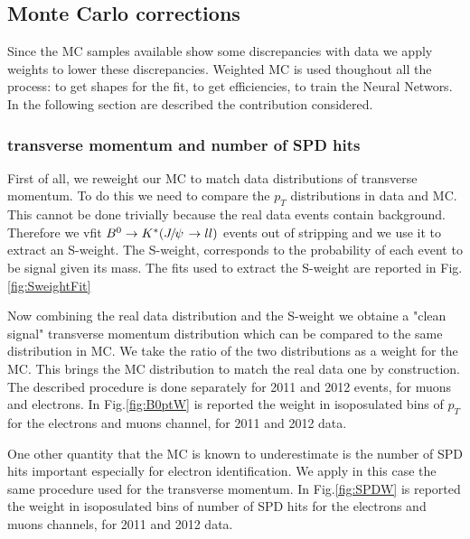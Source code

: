 \subsection{Monte Carlo corrections}

Since the MC samples available show some discrepancies with data we apply weights to lower these discrepancies.
Weighted MC is used thoughout all the process: to get shapes for the fit, to get efficiencies, to train the Neural Networs.
In the following section are described the contribution considered.

\subsubsection{\Bz transverse momentum and number of SPD hits}

First of all, we reweight our MC to match data distributions of \Bz transverse momentum.
To do this we need to compare the \Bz $p_T$ distributions in data and MC.
This cannot be done trivially because the real data events contain background.
Therefore we vfit ${{B}^0}\rightarrow{\ensuremath{{K}^*}}({{J\mskip -3mu/\mskip -2mu\psi\mskip 2mu}}\rightarrow ll)$ events out of stripping and we use it to extract an S-weight.
The S-weight, corresponds to the probability of each event to be signal given its mass.
The fits used to extract the S-weight are reported in Fig.\ref{fig:SweightFit} 

Now combining the real data distribution and the S-weight we obtaine a "clean signal" transverse momentum
distribution which can be compared to the same distribution in MC. We take the ratio of the two
distributions as a weight for the MC. This brings the MC distribution to match the real data one by construction.
The described procedure is done separately for 2011 and 2012 events, for muons and electrons.
In Fig.\ref{fig:B0ptW} is reported the weight in isoposulated bins of \Bz $p_T$ for the electrons and muons channel, for 2011 and 2012 data. 

One other quantity that the MC is known to underestimate is the number of SPD hits important especially
for electron identification. We apply in this case the same procedure used for the \Bz transverse momentum.
In Fig.\ref{fig:SPDW} is reported the weight in isoposulated bins of number of SPD hits for the electrons and muons channels, for 2011 and 2012 data.


